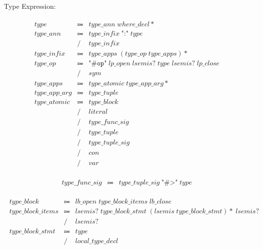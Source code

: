 Type Expression:

\begin{align*}
    \begin{array}{rcll}
        \mathit{type}
        &\Coloneq &\mathit{type\_ann}\; \mathit{where\_decl}{*} \\
        \mathit{type\_ann}
        &\Coloneq &\mathit{type\_infix}\; \texttt{":"}\; \mathit{type} \\
        &\mathrel{/} &\mathit{type\_infix} \\
        \mathit{type\_infix}
        &\Coloneq &\mathit{type\_apps}\; (\mathit{type\_op}\; \mathit{type\_apps}){*} \\
        \mathit{type\_op}
        &\Coloneq &\texttt{"\#op"}\; \mathit{lp\_open}\; \mathit{lsemis}{?}\; \mathit{type}\; \mathit{lsemis}{?}\; \mathit{lp\_close} \\
        &\mathrel{/} &\mathit{sym} \\
        \mathit{type\_apps}
        &\Coloneq &\mathit{type\_atomic}\; \mathit{type\_app\_arg}{*} \\
        \mathit{type\_app\_arg}
        &\Coloneq &\mathit{type\_tuple} \\
        \mathit{type\_atomic}
        &\Coloneq &\mathit{type\_block} \\
        &\mathrel{/} &\mathit{literal} \\
        &\mathrel{/} &\mathit{type\_func\_sig} \\
        &\mathrel{/} &\mathit{type\_tuple} \\
        &\mathrel{/} &\mathit{type\_tuple\_sig} \\
        &\mathrel{/} &\mathit{con} \\
        &\mathrel{/} &\mathit{var}
    \end{array}
\end{align*}

\begin{align*}
    \begin{array}{rcll}
        \mathit{type\_func\_sig}
        &\Coloneq &\mathit{type\_tuple\_sig}\; \texttt{"\#>"}\; \mathit{type}
    \end{array}
\end{align*}

\begin{align*}
    \begin{array}{rcll}
        \mathit{type\_block}
        &\Coloneq &\mathit{lb\_open}\; \mathit{type\_block\_items}\; \mathit{lb\_close} \\
        \mathit{type\_block\_items}
        &\Coloneq &\mathit{lsemis}{?}\; \mathit{type\_block\_stmt}\; (\mathit{lsemis}\; \mathit{type\_block\_stmt}){*}\; \mathit{lsemis}{?} \\
        &\mathrel{/} &\mathit{lsemis}{?} \\
        \mathit{type\_block\_stmt}
        &\Coloneq &\mathit{type} \\
        &\mathrel{/} &\mathit{local\_type\_decl}
    \end{array}
\end{align*}

